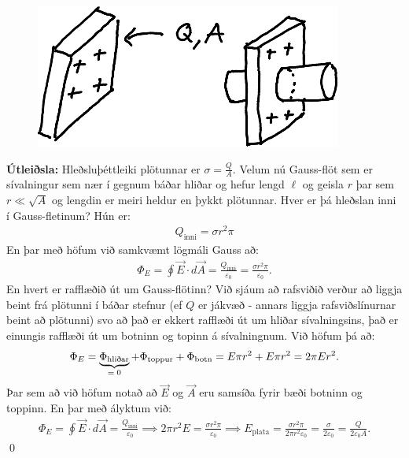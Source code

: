 \ifdefined \wholebook \else\documentclass[oneside]{book}\usepackage{EdlBook}\graphicspath{{figures/}}
\begin{document}
\begin{minipage}{\linewidth}

\begin{figure}
\vspace{0.4cm}
\centering
\includegraphics{figures/sivaln-hdrawn.pdf}
\end{figure}

\textbf{Útleiðsla:} Hleðsluþéttleiki plötunnar er $\sigma = \frac{Q}{A}$. Velum nú Gauss-flöt sem er sívalningur sem nær í gegnum báðar hliðar og hefur lengd $\ell$ og geisla $r$ þar sem $r \ll \sqrt{A}$ og lengdin er meiri heldur en þykkt plötunnar. Hver er þá hleðslan inni í Gauss-fletinum? Hún er:
\begin{align*}
    Q_{\text{inni}} = \sigma r^2 \pi 
\end{align*}
En þar með höfum við samkvæmt lögmáli Gauss að:
\begin{align*}
    \Phi_E = \oint \vec{E} \cdot d\vec{A} = \frac{Q_{\text{inni}}}{\varepsilon_0} = \frac{\sigma r^2 \pi}{\varepsilon_0}.
\end{align*}
En hvert er rafflæðið út um Gauss-flötinn? Við sjáum að rafsviðið verður að liggja beint frá plötunni í báðar stefnur (ef $Q$ er jákvæð - annars liggja rafsviðslínurnar beint að plötunni) svo að það er ekkert rafflæði út um hliðar sívalningsins, það er einungis rafflæði út um botninn og topinn á sívalningnum. Við höfum þá að:
\begin{align*}
    \Phi_E = \underbrace{\Phi_{\text{hliðar}}}_\textrm{$= 0$} + \Phi_{\text{toppur}} + \Phi_{\text{botn}} = E \pi r^2 + E\pi r^2 = 2\pi Er^2.
\end{align*}
Þar sem að við höfum notað að $\vec{E}$ og $\vec{A}$ eru samsíða fyrir bæði botninn og toppinn. En þar með ályktum við:
\begin{align*}
    \Phi_E = \oint \vec{E} \cdot d\vec{A} = \frac{Q_{\text{inni}}}{\varepsilon_0} \implies 2\pi r^2 E = \frac{\sigma r^2 \pi}{\varepsilon_0} \implies E_{\text{plata}} = \frac{\sigma r^2 \pi}{2\pi r^2 \varepsilon_0} = \frac{\sigma}{2 \varepsilon_0} = \frac{Q}{2\varepsilon_0 A}.
\end{align*}
\qed
\end{minipage}
\end{document}

